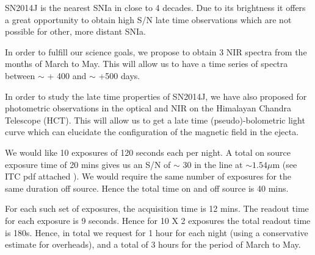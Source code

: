 \documentclass[11pt]{article}
\begin{document}
%

\expdesign    %
SN2014J is the nearest SNIa in close to 4 decades. Due to its brightness it offers a great opportunity to obtain high S/N late time observations which are not possible for other, more distant SNIa.

In order to fulfill our science goals, we propose to obtain 3 NIR spectra from the months of March to May. This will allow us to have  a time series of spectra between $\sim$ + 400 and $\sim$ +500 days. 


In order to study the late time properties of SN2014J, we have also proposed for photometric observations in the optical and NIR on the Himalayan Chandra Telescope (HCT). This will allow us to get a late time (pseudo)-bolometric light curve which can elucidate the configuration of the magnetic field in the ejecta. 

%

\technicaldescription    %
We would like 10 exposures of 120 seconds  each per night. A total on source exposure time of 20 mins  gives us an S/N of $\sim$ 30 in the line at $\sim 1.54 \mu$m (see ITC pdf attached ). 
We would require the same number of exposures for the same duration off source. Hence the total time on and off source is 40 mins. 

For each such set of  exposures, the acquisition time is 12 mins. The readout time for each exposure is 9 seconds. Hence for 10 X 2 exposures the total readout time is 180s. 
Hence, in total we request for 1 hour for each night (using a conservative estimate for overheads), and a total of 3 hours for the period of March to May. 
\end{document}
